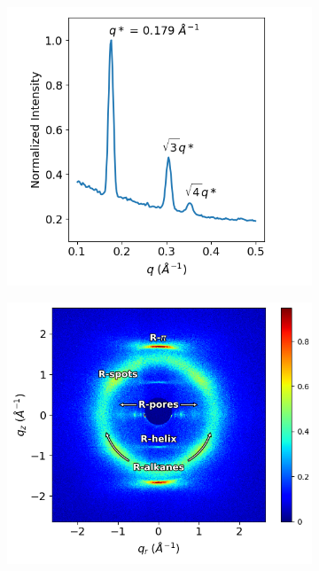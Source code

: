 \documentclass[journal=jpcbfk,manusciprt=article]{achemso}
\begin{document}
  \begin{figure}
        \centering
        \begin{subfigure}[t]{0.43\linewidth}
                \centering
                \includegraphics[width=\linewidth]{SAXS.png}
                \caption{}\label{fig:SAXS}
        \end{subfigure}
        \begin{subfigure}[t]{0.47\linewidth}
                \centering
                \includegraphics[width=\linewidth]{WAXS_annotated_words.png} 

\end{subfigure}
\end{figure}
\end{document}
